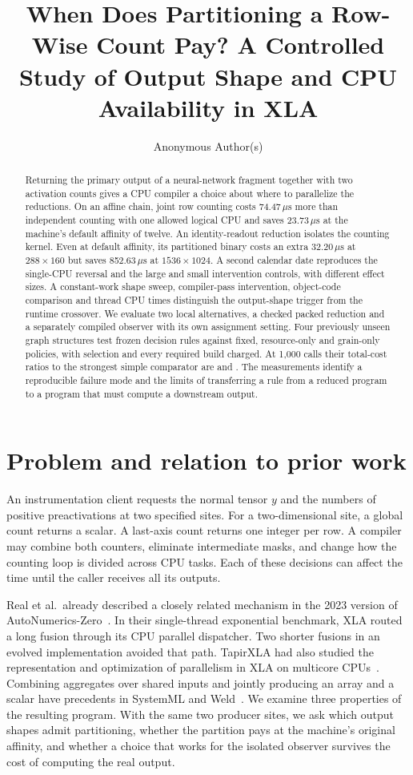 \documentclass[sigplan,10pt,review,anonymous,nonacm]{acmart}
\title[Partitioning Row-Wise Activation Counts]{When Does Partitioning a Row-Wise Count Pay? A Controlled Study of Output Shape and CPU Availability in XLA}
\author{Anonymous Author(s)}
\newcommand{\us}{\ensuremath{\,\mu\mathrm{s}}}
\begin{document}
\begin{abstract}
Returning the primary output of a neural-network fragment together with two activation counts gives a CPU compiler a choice about where to parallelize the reductions. On an affine chain, joint row counting costs 74.47\us{} more than independent counting with one allowed logical CPU and saves 23.73\us{} at the machine's default affinity of twelve. An identity-readout reduction isolates the counting kernel. Even at default affinity, its partitioned binary costs an extra 32.20\us{} at $288\times160$ but saves 852.63\us{} at $1536\times1024$. A second calendar date reproduces the single-CPU reversal and the large and small intervention controls, with different effect sizes. A constant-work shape sweep, compiler-pass intervention, object-code comparison and thread CPU times distinguish the output-shape trigger from the runtime crossover. We evaluate two local alternatives, a checked packed reduction and a separately compiled observer with its own assignment setting. Four previously unseen graph structures test frozen decision rules against fixed, resource-only and grain-only policies, with selection and every required build charged. At 1,000 calls their total-cost ratios to the strongest simple comparator are \PackedRatio{} and \ScopedRatio{}. The measurements identify a reproducible failure mode and the limits of transferring a rule from a reduced program to a program that must compute a downstream output.
\end{abstract}
\maketitle

\section{Problem and relation to prior work}
An instrumentation client requests the normal tensor $y$ and the numbers of positive preactivations at two specified sites. For a two-dimensional site, a global count returns a scalar. A last-axis count returns one integer per row. A compiler may combine both counters, eliminate intermediate masks, and change how the counting loop is divided across CPU tasks. Each of these decisions can affect the time until the caller receives all its outputs.

Real et al.\ already described a closely related mechanism in the 2023 version of AutoNumerics-Zero~\cite{autonumericszero}. In their single-thread exponential benchmark, XLA routed a long fusion through its CPU parallel dispatcher. Two shorter fusions in an evolved implementation avoided that path. TapirXLA had also studied the representation and optimization of parallelism in XLA on multicore CPUs~\cite{tapirxla}. Combining aggregates over shared inputs and jointly producing an array and a scalar have precedents in SystemML and Weld~\cite{systemml,weld}. We examine three properties of the resulting program. With the same two producer sites, we ask which output shapes admit partitioning, whether the partition pays at the machine's original affinity, and whether a choice that works for the isolated observer survives the cost of computing the real output.
\end{document}
